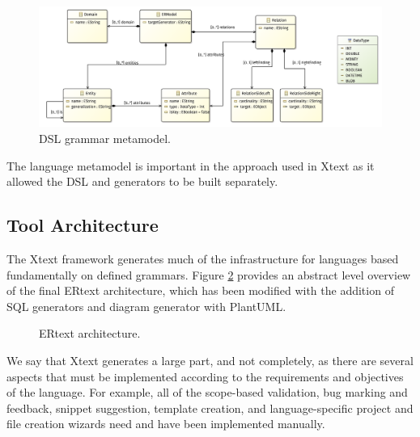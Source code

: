 \begin{figure}[!htb]
    \centering
    \caption{DSL grammar metamodel.}
    \label{fig:metamodel}
    \includegraphics[width=\textwidth]{img/erDsl_class_diagram.png}
\end{figure}

The language metamodel is important in the approach used in Xtext as it allowed the DSL and generators to be built separately.


\subsection{Tool Architecture}

The Xtext framework generates much of the infrastructure for languages based fundamentally on defined grammars.
Figure \ref{fig:arqERtext} provides an abstract level overview of the final ERtext architecture, which has been modified with the addition of SQL generators and diagram generator with PlantUML.

\begin{figure}[!htb]
    \centering
    \caption{ERtext architecture.}
    \label{fig:arqERtext}
    
\end{figure}

We say that Xtext generates a large part, and not completely, as there are several aspects that must be implemented according to the requirements and objectives of the language.
For example, all of the scope-based validation, bug marking and feedback, snippet suggestion, template creation, and language-specific project and file creation wizards need and have been implemented manually.

